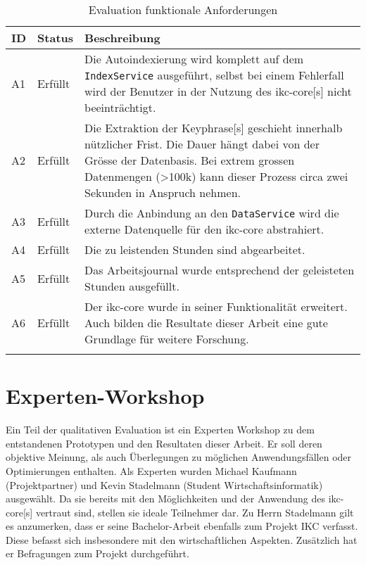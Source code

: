\begin{longtable}{|p{1.5cm} | p{1.5cm} | p{8.1cm}|}
  \hline
    ID & Status & Beschreibung \\\hline
    A1 & Erfüllt & Die Autoindexierung wird komplett auf dem \texttt{IndexService} ausgeführt, selbst bei einem Fehlerfall wird der Benutzer in der Nutzung des \gls{ikc-core}[s] nicht beeinträchtigt.\\\hline
    A2 & Erfüllt & Die Extraktion der \gls{Keyphrase}[s] geschieht innerhalb nützlicher Frist. Die Dauer hängt dabei von der Grösse der Datenbasis. Bei extrem grossen Datenmengen (>100k) kann dieser Prozess circa zwei Sekunden in Anspruch nehmen.\\\hline
    A3 & Erfüllt & Durch die Anbindung an den \texttt{DataService} wird die externe Datenquelle für den \gls{ikc-core} abstrahiert.\\\hline
    A4 & Erfüllt & Die zu leistenden Stunden sind abgearbeitet.\\\hline
    A5 & Erfüllt & Das Arbeitsjournal wurde entsprechend der geleisteten Stunden ausgefüllt.\\\hline
    A6 & Erfüllt & Der \gls{ikc-core} wurde in seiner Funktionalität erweitert. Auch bilden die Resultate dieser Arbeit eine gute Grundlage für weitere Forschung.\\\hline
    \caption{Evaluation funktionale Anforderungen}
  \label{tab:nicht-funktionale-anforderungen-eval}
\end{longtable}

\section{Experten-Workshop}

Ein Teil der qualitativen Evaluation ist ein Experten Workshop zu dem entstandenen Prototypen und den Resultaten dieser Arbeit. Er soll deren objektive Meinung, als auch Überlegungen zu möglichen Anwendungsfällen oder Optimierungen enthalten. Als Experten wurden Michael Kaufmann (Projektpartner) und Kevin Stadelmann (Student Wirtschaftsinformatik) ausgewählt. Da sie bereits mit den Mög\-lich\-keit\-en und der Anwendung des \gls{ikc-core}[s] vertraut sind, stellen sie ideale Teilnehmer dar. Zu Herrn Stadelmann gilt es anzumerken, dass er seine Bachelor-Arbeit ebenfalls zum Projekt \gls{IKC} verfasst. Diese befasst sich insbesondere mit den wirtschaftlichen Aspekten. Zusätzlich hat er Befragungen zum Projekt durchgeführt.

